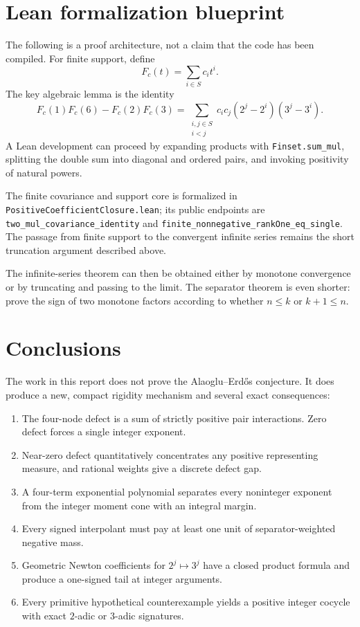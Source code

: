 \documentclass[11pt]{article}
\theoremstyle{definition}
\begin{document}
\section{Lean formalization blueprint}\label{sec:lean}

The following is a proof architecture, not a claim that the code has been compiled.  For finite support, define
\[
 F_c(t)=\sum_{i\in S}c_i t^i.
\]
The key algebraic lemma is the identity
\[
 F_c(1)F_c(6)-F_c(2)F_c(3)
 =\sum_{\substack{i,j\in S\\i<j}}c_ic_j(2^j-2^i)(3^j-3^i).
\]
A Lean development can proceed by expanding products with \texttt{Finset.sum\_mul}, splitting the double sum into diagonal and ordered pairs, and invoking positivity of natural powers.

The finite covariance and support core is formalized in
\texttt{PositiveCoefficientClosure.lean}; its public endpoints are
\texttt{two\_mul\_covariance\_identity} and
\texttt{finite\_nonnegative\_rankOne\_eq\_single}.  The passage from finite support to
the convergent infinite series remains the short truncation argument described above.

The infinite-series theorem can then be obtained either by monotone convergence or by truncating and passing to the limit.  The separator theorem is even shorter: prove the sign of two monotone factors according to whether $n\le k$ or $k+1\le n$.

\section{Conclusions}\label{sec:conclusion}

The work in this report does not prove the Alaoglu--Erd\H{o}s conjecture.  It does produce a new, compact rigidity mechanism and several exact consequences:
\begin{enumerate}
\item The four-node defect is a sum of strictly positive pair interactions.  Zero defect forces a single integer exponent.
\item Near-zero defect quantitatively concentrates any positive representing measure, and rational weights give a discrete defect gap.
\item A four-term exponential polynomial separates every noninteger exponent from the integer moment cone with an integral margin.
\item Every signed interpolant must pay at least one unit of separator-weighted negative mass.
\item Geometric Newton coefficients for $2^j\mapsto3^j$ have a closed product formula and produce a one-signed tail at integer arguments.
\item Every primitive hypothetical counterexample yields a positive integer cocycle with exact $2$-adic or $3$-adic signatures.
\end{enumerate}
\end{document}
